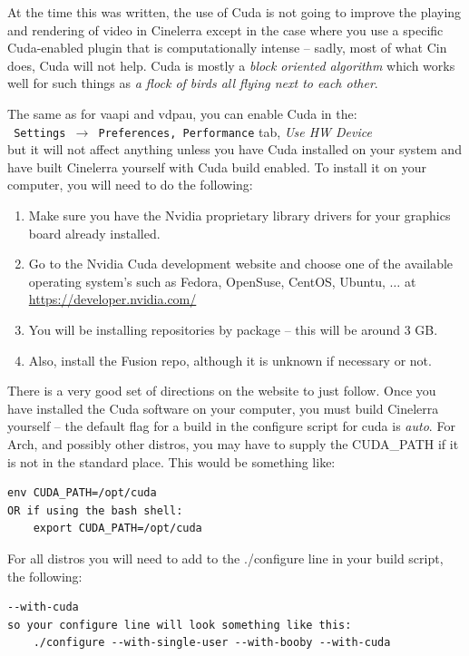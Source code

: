At the time this was written, the use of Cuda is not going to improve the playing and rendering of video in Cinelerra except in the case where you use a specific Cuda-enabled plugin that is computationally intense -- sadly, most of what Cin does, Cuda will not help.  Cuda is mostly a \textit{block oriented algorithm} which works well for such things as \textit{a flock of birds all flying next to each other}.

The same as for vaapi and vdpau, you can enable Cuda in the:\\
\texttt{ Settings $\rightarrow$ Preferences, Performance} tab, \textit{Use HW Device}\\
but it will not affect anything unless you have Cuda installed on your system and have built Cinelerra yourself with Cuda build enabled.  To install it on your computer, you will need to do the following:

\begin{enumerate}
	\item Make sure you have the Nvidia proprietary library drivers for your graphics board already installed.
	\item Go to the Nvidia Cuda development website and choose one of the available operating system’s
	such as Fedora, OpenSuse, CentOS, Ubuntu, $\dots$ at   {\small \url{https://developer.nvidia.com/}}
	\item You will be installing repositories by package -- this will be around 3 GB.
	\item Also, install the Fusion repo, although it is unknown if necessary or not.
\end{enumerate}

There is a very good set of directions on the website to just follow.  Once you have installed the Cuda software on your computer, you must build Cinelerra yourself -- 
the default flag for a build in the configure script for cuda is \textit{auto}.  For Arch, and possibly
other distros, you may have to supply the CUDA\_PATH if it is not in the standard place.  This would be
something like:


\begin{lstlisting}[numbers=none]
	env CUDA_PATH=/opt/cuda
OR if using the bash shell: 
	export CUDA_PATH=/opt/cuda
\end{lstlisting}
For all distros you will need to add to the ./configure line in your build script, the following:


\begin{lstlisting}[numbers=none]
	--with-cuda
so your configure line will look something like this:
	./configure --with-single-user --with-booby --with-cuda
\end{lstlisting}

